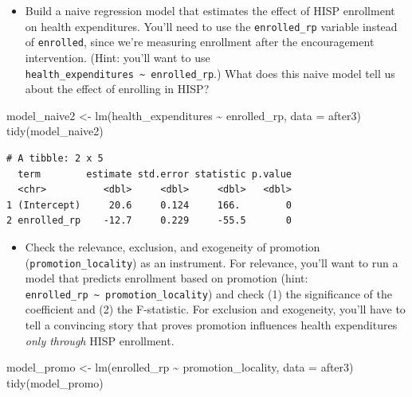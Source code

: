 \documentclass[
  letterpaper,
  DIV=11,
  numbers=noendperiod]{scrartcl}
\newenvironment{Shaded}{\begin{snugshade}}{\end{snugshade}}
\newcommand{\AttributeTok}[1]{\textcolor[rgb]{0.40,0.45,0.13}{#1}}
\newcommand{\FunctionTok}[1]{\textcolor[rgb]{0.28,0.35,0.67}{#1}}
\newcommand{\NormalTok}[1]{\textcolor[rgb]{0.00,0.23,0.31}{#1}}
\newcommand{\OtherTok}[1]{\textcolor[rgb]{0.00,0.23,0.31}{#1}}
\newcommand{\SpecialCharTok}[1]{\textcolor[rgb]{0.37,0.37,0.37}{#1}}
\providecommand{\tightlist}{%
  \setlength{\itemsep}{0pt}\setlength{\parskip}{0pt}}\usepackage{longtable,booktabs,array}
\begin{document}
\begin{itemize}
\tightlist
\item
  Build a naive regression model that estimates the effect of HISP
  enrollment on health expenditures. You'll need to use the
  \texttt{enrolled\_rp} variable instead of \texttt{enrolled}, since
  we're measuring enrollment after the encouragement intervention.
  (Hint: you'll want to use
  \texttt{health\_expenditures\ \textasciitilde{}\ enrolled\_rp}.) What
  does this naive model tell us about the effect of enrolling in HISP?
\end{itemize}

\begin{Shaded}
\begin{Highlighting}[numbers=left,,]
\NormalTok{model\_naive2 }\OtherTok{\textless{}{-}} \FunctionTok{lm}\NormalTok{(health\_expenditures }\SpecialCharTok{\textasciitilde{}}\NormalTok{ enrolled\_rp,}
                   \AttributeTok{data =}\NormalTok{ after3)}
\FunctionTok{tidy}\NormalTok{(model\_naive2)}
\end{Highlighting}
\end{Shaded}

\begin{verbatim}
# A tibble: 2 x 5
  term        estimate std.error statistic p.value
  <chr>          <dbl>     <dbl>     <dbl>   <dbl>
1 (Intercept)     20.6     0.124     166.        0
2 enrolled_rp    -12.7     0.229     -55.5       0
\end{verbatim}

\begin{itemize}
\tightlist
\item
  Check the relevance, exclusion, and exogeneity of promotion
  (\texttt{promotion\_locality}) as an instrument. For relevance, you'll
  want to run a model that predicts enrollment based on promotion (hint:
  \texttt{enrolled\_rp\ \textasciitilde{}\ promotion\_locality}) and
  check (1) the significance of the coefficient and (2) the F-statistic.
  For exclusion and exogeneity, you'll have to tell a convincing story
  that proves promotion influences health expenditures \emph{only
  through} HISP enrollment.
\end{itemize}

\begin{Shaded}
\begin{Highlighting}[numbers=left,,]
\NormalTok{model\_promo }\OtherTok{\textless{}{-}} \FunctionTok{lm}\NormalTok{(enrolled\_rp }\SpecialCharTok{\textasciitilde{}}\NormalTok{ promotion\_locality,}
                   \AttributeTok{data =}\NormalTok{ after3)}
\FunctionTok{tidy}\NormalTok{(model\_promo)}
\end{Highlighting}
\end{Shaded}
\end{document}

